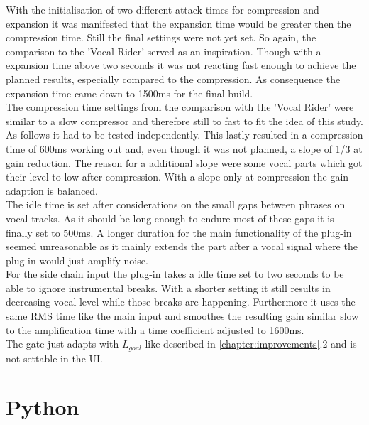 With the initialisation of two different attack times for compression and expansion it was manifested that the expansion time would be greater then the compression time. Still the final settings were not yet set. So again, the comparison to the 'Vocal Rider' served as an inspiration. Though with a expansion time above two seconds it was not reacting fast enough to achieve the planned results, especially compared to the compression. As consequence the expansion time came down to 1500ms for the final build.\\
The compression time settings from the comparison with the 'Vocal Rider' were similar to a slow compressor and therefore still to fast to fit the idea of this study. As follows it had to be tested independently. This lastly resulted in a compression time of 600ms working out and, even though it was not planned, a slope of 1/3 at gain reduction. The reason for a additional slope were some vocal parts which got their level to low after compression. With a slope only at compression the gain adaption is balanced.\\
The idle time is set after considerations on the small gaps between phrases on vocal tracks. As it should be long enough to endure most of these gaps it is finally set to 500ms. A longer duration for the main functionality of the plug-in seemed unreasonable as it mainly extends the part after a vocal signal where the plug-in would just amplify noise.\\
For the side chain input the plug-in takes a idle time set to two seconds to be able to ignore instrumental breaks. With a shorter setting it still results in decreasing vocal level while those breaks are happening. Furthermore it uses the same RMS time like the main input and smoothes the resulting gain similar slow to the amplification time with a time coefficient adjusted to 1600ms.\\
The gate just adapts with $L_{goal}$ like described in \ref{chapter:improvements}.2 and is not settable in the UI.\\

\section{Python}

